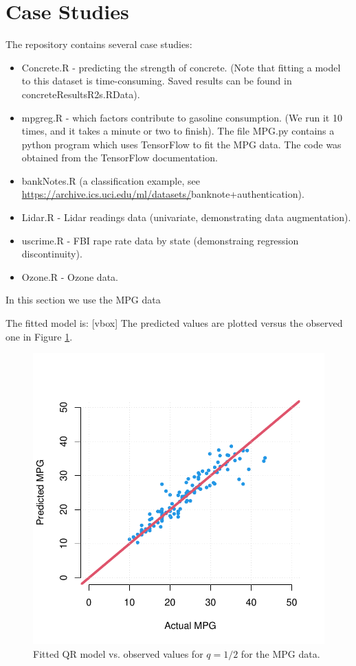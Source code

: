 \documentclass[a4paper,12pt]{article}
\begin{document}
\section{Case Studies}
The repository contains several case studies:
\begin{itemize}
 \item Concrete.R - predicting the strength of concrete. (Note that fitting a model to this dataset is time-consuming. Saved results can be found in concreteResultsR2s.RData).
 \item mpgreg.R - which factors contribute to gasoline consumption. (We run it 10 times, and it takes a minute or two to finish). The file MPG.py contains a python program which uses TensorFlow to fit the MPG data. The code was obtained from the TensorFlow documentation.
 \item bankNotes.R (a classification example, see \url{https://archive.ics.uci.edu/ml/datasets/}banknote+authentication).
 \item Lidar.R - Lidar readings data (univariate, demonstrating data augmentation).
 \item uscrime.R - FBI rape rate data by state (demonstraing regression discontinuity).
 \item Ozone.R - Ozone data.
\end{itemize}

In this section we use the MPG data

The fitted model is: [vbox]
\noindent The predicted values are plotted versus the observed one in Figure \ref{mpgplot}.

\begin{figure}[b!]
\centering
\includegraphics[width=.5\linewidth]{Figures/mpg.pdf}
\caption{Fitted QR model vs. observed values for $q=1/2$ for the MPG data.}\label{mpgplot}
\end{figure} 
\end{document}
